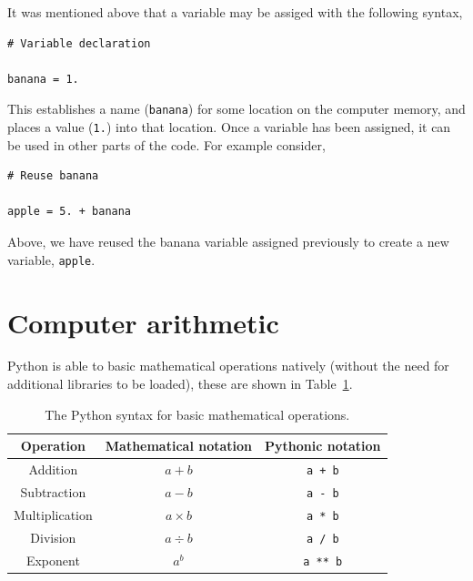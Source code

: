 \documentclass[a4paper]{article}
\begin{document}
It was mentioned above that a variable may be assiged with the following syntax,
\begin{lstlisting}
# Variable declaration

banana = 1.
\end{lstlisting}
This establishes a name (\texttt{banana}) for some location on the computer memory, and places a value (\texttt{1.}) into that location.
Once a variable has been assigned, it can be used in other parts of the code.
For example consider, 
\begin{lstlisting}
# Reuse banana

apple = 5. + banana
\end{lstlisting}
Above, we have reused the banana variable assigned previously to create a new variable, \texttt{apple}. 
\vspace{\baselineskip}
\begin{center}
	\noindent{}
\end{center}

\section{Computer arithmetic}

Python is able to basic mathematical operations natively (without the need for additional libraries to be loaded), these are shown in Table~\ref{tab:ops}.
\begin{table}[h]
	\centering
	\caption{The Python syntax for basic mathematical operations.}
	\label{tab:ops}
	\begin{tabular}{c c c}
		\hline
		Operation & Mathematical notation & Pythonic notation \\
		\hline
		Addition & $a + b$ & \texttt{a + b} \\
		Subtraction & $a - b$ & \texttt{a - b} \\
		Multiplication & $a \times b$ & \texttt{a * b} \\
		Division & $a \div b$ & \texttt{a / b} \\
		Exponent & $a^b$ & \texttt{a ** b} \\
		\hline
	\end{tabular}
\end{table}
\end{document}
